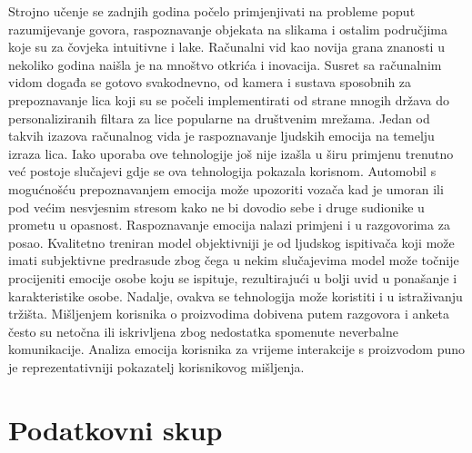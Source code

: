 \documentclass[times, utf8, zavrsni,numeric,pstricks]{fer}
\begin{document}
Strojno učenje se zadnjih godina počelo primjenjivati na probleme poput razumijevanje govora, raspoznavanje objekata na slikama i ostalim područjima koje su za čovjeka intuitivne i lake. Računalni vid kao novija grana znanosti u nekoliko godina naišla je na mnoštvo otkrića i inovacija. Susret sa računalnim vidom događa se gotovo svakodnevno, od kamera i sustava sposobnih za prepoznavanje lica koji su se počeli implementirati od strane mnogih država do personaliziranih filtara za lice popularne na društvenim mrežama. Jedan od takvih izazova računalnog vida je raspoznavanje ljudskih emocija na temelju izraza lica. Iako uporaba ove tehnologije još nije izašla u širu primjenu trenutno već postoje slučajevi gdje se ova tehnologija pokazala korisnom. Automobil s mogućnošću prepoznavanjem emocija može upozoriti vozača kad je umoran ili pod većim nesvjesnim stresom kako ne bi dovodio sebe i druge sudionike u prometu u opasnost. Raspoznavanje emocija nalazi primjeni i u razgovorima za posao. Kvalitetno treniran model objektivniji je od ljudskog ispitivača koji može imati subjektivne predrasude zbog čega u nekim slučajevima model može točnije procijeniti emocije osobe koju se ispituje, rezultirajući u bolji uvid u ponašanje i karakteristike osobe. Nadalje, ovakva se tehnologija može koristiti i u istraživanju tržišta. Mišljenjem korisnika o proizvodima dobivena putem razgovora i anketa često su netočna ili iskrivljena zbog nedostatka spomenute neverbalne komunikacije. Analiza emocija korisnika za vrijeme interakcije s proizvodom puno je reprezentativniji pokazatelj korisnikovog mišljenja. 



%



\chapter{Podatkovni skup}
\end{document}
